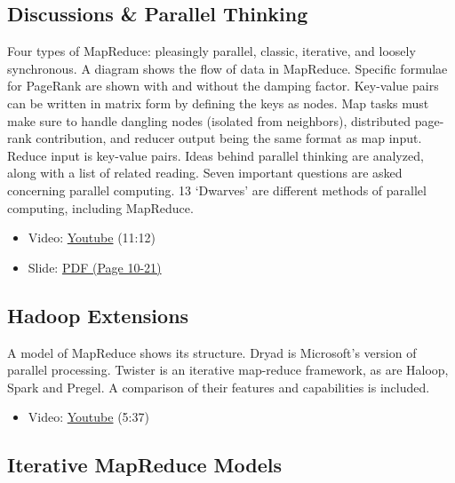 \subsection{Discussions \& Parallel
Thinking}\label{discussions-parallel-thinking}

Four types of MapReduce: pleasingly parallel, classic, iterative, and
loosely synchronous. A diagram shows the flow of data in MapReduce.
Specific formulae for PageRank are shown with and without the damping
factor. Key-value pairs can be written in matrix form by defining the
keys as nodes. Map tasks must make sure to handle dangling nodes
(isolated from neighbors), distributed page-rank contribution, and
reducer output being the same format as map input. Reduce input is
key-value pairs. Ideas behind parallel thinking are analyzed, along with
a list of related reading. Seven important questions are asked
concerning parallel computing. 13 `Dwarves' are different methods of
parallel computing, including MapReduce.

\begin{itemize}

\item
  Video: \href{https://www.youtube.com/watch?v=ISJp7TUzo1s}{Youtube}
  (11:12)
\end{itemize}

\begin{itemize}

\item
  Slide:
  \href{https://drive.google.com/open?id=0B88HKpainTSfWFpEZGxqSWRTYms}{PDF
  (Page 10-21)}
\end{itemize}

\subsection{Hadoop Extensions}\label{hadoop-extensions}

A model of MapReduce shows its structure. Dryad is Microsoft's version
of parallel processing. Twister is an iterative map-reduce framework, as
are Haloop, Spark and Pregel. A comparison of their features and
capabilities is included.

\begin{itemize}

\item
  Video: \href{https://www.youtube.com/watch?v=gS7TImRZZ1g}{Youtube}
  (5:37)
\end{itemize}

\subsection{Iterative MapReduce
Models}\label{iterative-mapreduce-models}

